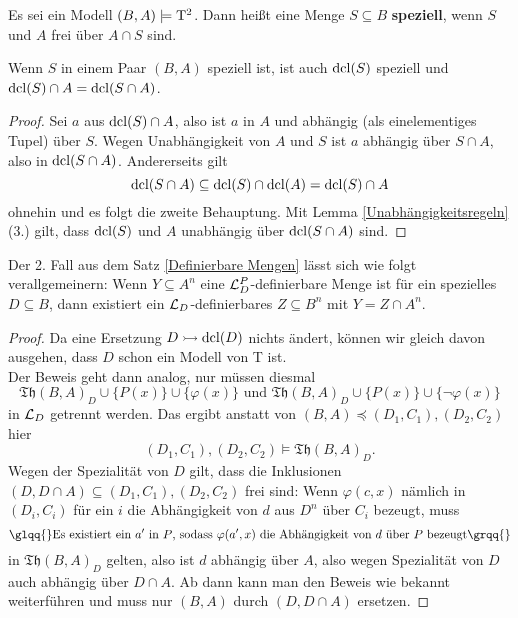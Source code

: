 \begin{definition}
	Es sei ein Modell $(B,A)\models\operatorname{T^2}$. Dann heißt eine Menge $S\subseteq B$ \textbf{speziell}, wenn $S$ und $A$ frei über $A\cap S$ sind.
\end{definition}

\begin{lemma}\label{Spezialität dcl}
	Wenn $S$ in einem Paar $(B,A)$ speziell ist, ist auch $\operatorname{dcl}(S)$ speziell und $\operatorname{dcl}(S)\cap A=\operatorname{dcl}(S\cap A)$.
\end{lemma}
\begin{proof}
	Sei $a$ aus $\operatorname{dcl}(S)\cap A$, also ist $a$ in $A$ und abhängig (als einelementiges Tupel) über $S$. Wegen Unabhängigkeit von $A$ und $S$ ist $a$ abhängig über $S\cap A$, also in $\operatorname{dcl}(S\cap A)$. Andererseits gilt $$\operatorname{dcl}(S\cap A)\subseteq\operatorname{dcl}(S)\cap\operatorname{dcl}(A)=\operatorname{dcl}(S)\cap A$$ ohnehin und es folgt die zweite Behauptung. Mit Lemma \ref{Unabhängigkeitsregeln} (3.) gilt, dass $\operatorname{dcl}(S)$ und $A$ unabhängig über $\operatorname{dcl}(S\cap A)$ sind.
\end{proof}

\begin{lemma}\label{Definierbare Mengen Spezialität}
	Der 2. Fall aus dem Satz \ref{Definierbare Mengen} lässt sich wie folgt verallgemeinern: Wenn $Y\subseteq A^n$ eine $\mathcal{L}^P_D$-definierbare Menge ist für ein spezielles $D\subseteq B$, dann existiert ein $\mathcal{L}_D$-definierbares $Z\subseteq B^n$ mit $Y=Z\cap A^n$.
\end{lemma}
\begin{proof}
	Da eine Ersetzung $D\rightarrowtail\operatorname{dcl}(D)$ nichts ändert, können wir gleich davon ausgehen, dass $D$ schon ein Modell von T ist.\\
	Der Beweis geht dann analog, nur müssen diesmal $$\mathfrak{Th}(B,A)_D\cup\{P(x)\}\cup\{\varphi(x)\}\text{ und }\mathfrak{Th}(B,A)_D\cup\{P(x)\}\cup\{\neg\varphi(x)\}$$ in $\mathcal{L}_D$ getrennt werden. Das ergibt anstatt von $(B,A)\preceq(D_1,C_1),(D_2,C_2)$ hier $$(D_1,C_1),(D_2,C_2)\models\mathfrak{Th}(B,A)_D.$$
	Wegen der Spezialität von $D$ gilt, dass die Inklusionen $(D,D\cap A)\subseteq(D_1,C_1),(D_2,C_2)$ frei sind: Wenn $\varphi(c,x)$ nämlich in $(D_i,C_i)$ für ein $i$ die Abhängigkeit von $d$ aus $D^n$ über $C_i$ bezeugt, muss $$\glqq{}\text{Es existiert ein }a'\text{ in }P\text{, sodass }\varphi(a',x)\text{ die Abhängigkeit von }d\text{ über }P\text{ bezeugt}\grqq{}$$ in $\mathfrak{Th}(B,A)_D$ gelten, also ist $d$ abhängig über $A$, also wegen Spezialität von $D$ auch abhängig über $D\cap A$. Ab dann kann man den Beweis wie bekannt weiterführen und muss nur $(B,A)$ durch $(D,D\cap A)$ ersetzen.
\end{proof}

